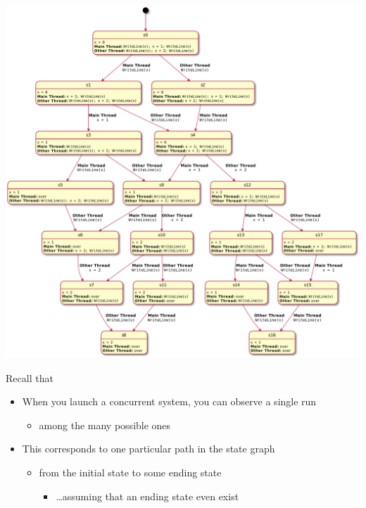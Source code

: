 \documentclass{beamer}\mode<presentation>{\usetheme{AMSBolognaFC}}
\begin{document}
\begin{frame}[allowframebreaks]
\begin{center}
        \includegraphics[height=.7\textheight]{img/state-diagram.pdf}
    \end{center}

    \framebreak

    \begin{alertblock}{Recall that}
        \begin{itemize}
            \item When you launch a concurrent system, you can observe a single run
            \begin{itemize}
                \item among the many possible ones
            \end{itemize}

            \item This corresponds to one particular path in the state graph
            \begin{itemize}
                \item from the initial state to some ending state
                \begin{itemize}
                    \item \ldots assuming that an ending state even exist
                \end{itemize}
            \end{itemize}
        \end{itemize}
    \end{alertblock}

\end{frame}
\end{document}
